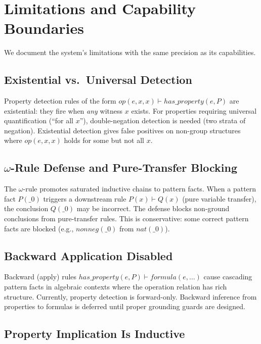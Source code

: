 \section{Limitations and Capability Boundaries}
\label{sec:limitations}

We document the system's limitations with the same precision as its capabilities.

\subsection{Existential vs.\ Universal Detection}

Property detection rules of the form $\mathit{op}(e, x, x) \vdash \mathit{has\_property}(e, P)$ are existential: they fire when \emph{any} witness $x$ exists. For properties requiring universal quantification (``for all $x$''), double-negation detection is needed (two strata of negation). Existential detection gives false positives on non-group structures where $\mathit{op}(e, x, x)$ holds for some but not all $x$.

\subsection{$\omega$-Rule Defense and Pure-Transfer Blocking}

The $\omega$-rule promotes saturated inductive chains to pattern facts. When a pattern fact $P(\_0)$ triggers a downstream rule $P(x) \vdash Q(x)$ (pure variable transfer), the conclusion $Q(\_0)$ may be incorrect. The defense blocks non-ground conclusions from pure-transfer rules. This is conservative: some correct pattern facts are blocked (e.g., $\mathit{nonneg}(\_0)$ from $\mathit{nat}(\_0)$).

\subsection{Backward Application Disabled}

Backward (apply) rules $\mathit{has\_property}(e, P) \vdash \mathit{formula}(e, \ldots)$ cause cascading pattern facts in algebraic contexts where the operation relation has rich structure. Currently, property detection is forward-only. Backward inference from properties to formulas is deferred until proper grounding guards are designed.

\subsection{Property Implication Is Inductive}

